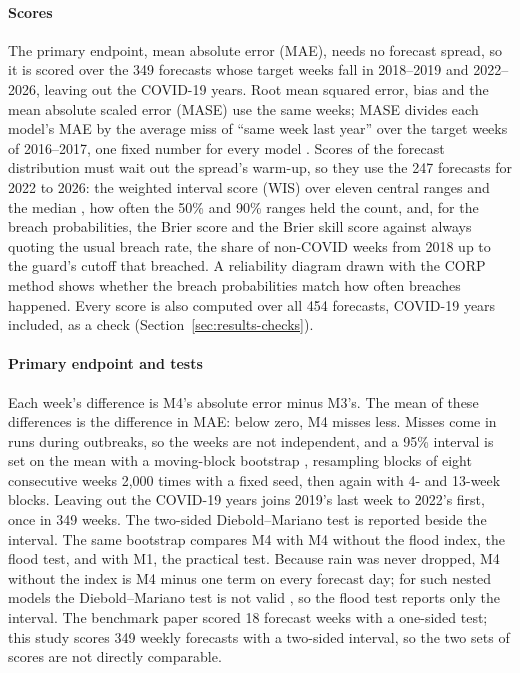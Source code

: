 \paragraph{Scores}
The primary endpoint, mean absolute error (MAE), needs no forecast spread, so it is scored over
the 349 forecasts whose target weeks fall in 2018--2019 and 2022--2026, leaving out the COVID-19
years. Root mean squared error, bias and the mean absolute scaled error (MASE) use the same weeks;
MASE divides each model's MAE by the average miss of ``same week last year'' over the target
weeks of 2016--2017, one fixed number for every model \parencite{hyndman2006}. Scores of the
forecast distribution must wait out the spread's warm-up, so they use the 247 forecasts for 2022
to 2026: the weighted interval score (WIS) over eleven central ranges and the median
\parencite{bracher2021}, how often the 50\% and 90\% ranges held the count, and, for the breach
probabilities, the Brier score \parencite{brier1950} and the Brier skill score against always
quoting the usual breach rate, the share of non-COVID weeks from 2018 up to the guard's cutoff
that breached. A reliability diagram drawn with the CORP method \parencite{dimitriadis2021} shows
whether the breach probabilities match how often breaches happened. Every score is also computed
over all 454 forecasts, COVID-19 years included, as a check (Section~\ref{sec:results-checks}).

\paragraph{Primary endpoint and tests}
Each week's difference is M4's absolute error minus M3's. The mean of these differences is the
difference in MAE: below zero, M4 misses less. Misses come in runs during outbreaks, so the weeks
are not independent, and a 95\% interval is set on the mean with a moving-block bootstrap
\parencite{kunsch1989}, resampling blocks of eight consecutive weeks 2,000 times with a fixed
seed, then again with 4- and 13-week blocks. Leaving out the COVID-19 years joins 2019's last
week to 2022's first, once in 349 weeks. The two-sided Diebold--Mariano test
\parencite{diebold1995} is reported beside the interval. The same bootstrap compares M4 with M4 without the
flood index, the flood test, and with M1, the practical test. Because rain was never dropped, M4
without the index is M4 minus one term on every forecast day; for such nested models the
Diebold--Mariano test is not valid \parencite{clark2001}, so the flood test reports only the
interval. The benchmark paper scored 18 forecast weeks with a one-sided test; this study scores
349 weekly forecasts with a two-sided interval, so the two sets of scores are not directly
comparable.

